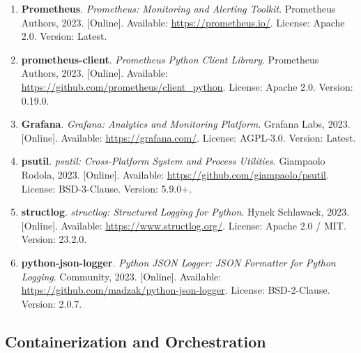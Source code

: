 \begin{enumerate}[resume]
    \item \textbf{Prometheus}. \textit{Prometheus: Monitoring and Alerting Toolkit}. 
    Prometheus Authors, 2023. [Online]. Available: \url{https://prometheus.io/}. 
    License: Apache 2.0. Version: Latest.
    
    \item \textbf{prometheus-client}. \textit{Prometheus Python Client Library}. 
    Prometheus Authors, 2023. [Online]. Available: \url{https://github.com/prometheus/client_python}. 
    License: Apache 2.0. Version: 0.19.0.
    
    \item \textbf{Grafana}. \textit{Grafana: Analytics and Monitoring Platform}. 
    Grafana Labs, 2023. [Online]. Available: \url{https://grafana.com/}. 
    License: AGPL-3.0. Version: Latest.
    
    \item \textbf{psutil}. \textit{psutil: Cross-Platform System and Process Utilities}. 
    Giampaolo Rodola, 2023. [Online]. Available: \url{https://github.com/giampaolo/psutil}. 
    License: BSD-3-Clause. Version: 5.9.0+.
    
    \item \textbf{structlog}. \textit{structlog: Structured Logging for Python}. 
    Hynek Schlawack, 2023. [Online]. Available: \url{https://www.structlog.org/}. 
    License: Apache 2.0 / MIT. Version: 23.2.0.
    
    \item \textbf{python-json-logger}. \textit{Python JSON Logger: JSON Formatter for Python Logging}. 
    Community, 2023. [Online]. Available: \url{https://github.com/madzak/python-json-logger}. 
    License: BSD-2-Clause. Version: 2.0.7.
\end{enumerate}

\subsection*{Containerization and Orchestration}

